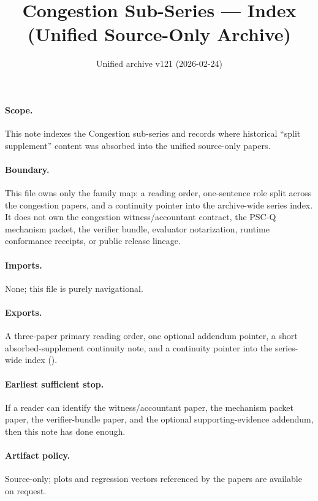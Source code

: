 \documentclass[11pt]{article}
\title{Congestion Sub-Series --- Index (Unified Source-Only Archive)}
\author{}
\date{Unified archive v121 (2026-02-24)}
\begin{document}
\maketitle

\paragraph{Scope.}
This note indexes the Congestion sub-series and records where historical ``split supplement'' content was absorbed into the unified source-only papers.

\paragraph{Boundary.}
This file owns only the family map: a reading order, one-sentence role split across the congestion papers, and a continuity pointer into the archive-wide series index. It does not own the congestion witness/accountant contract, the PSC-Q mechanism packet, the verifier bundle, evaluator notarization, runtime conformance receipts, or public release lineage.

\paragraph{Imports.}
None; this file is purely navigational.

\paragraph{Exports.}
A three-paper primary reading order, one optional addendum pointer, a short absorbed-supplement continuity note, and a continuity pointer into the series-wide index ().

\paragraph{Earliest sufficient stop.}
If a reader can identify the witness/accountant paper, the mechanism packet paper, the verifier-bundle paper, and the optional supporting-evidence addendum, then this note has done enough.

\paragraph{Artifact policy.}
Source-only; plots and regression vectors referenced by the papers are available on request.
\end{document}
